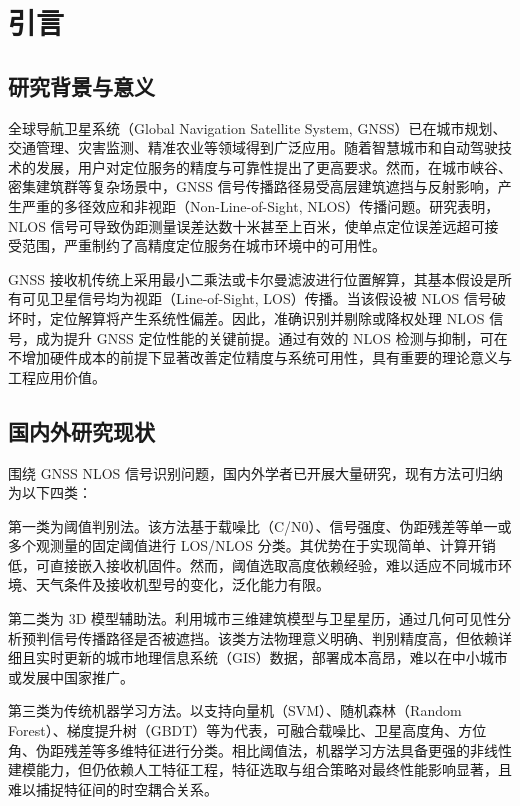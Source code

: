 \chapter{引言}

\section{研究背景与意义}

全球导航卫星系统（Global Navigation Satellite System, GNSS）已在城市规划、交通管理、灾害监测、精准农业等领域得到广泛应用。随着智慧城市和自动驾驶技术的发展，用户对定位服务的精度与可靠性提出了更高要求。然而，在城市峡谷、密集建筑群等复杂场景中，GNSS 信号传播路径易受高层建筑遮挡与反射影响，产生严重的多径效应和非视距（Non-Line-of-Sight, NLOS）传播问题。研究表明，NLOS 信号可导致伪距测量误差达数十米甚至上百米，使单点定位误差远超可接受范围，严重制约了高精度定位服务在城市环境中的可用性。

GNSS 接收机传统上采用最小二乘法或卡尔曼滤波进行位置解算，其基本假设是所有可见卫星信号均为视距（Line-of-Sight, LOS）传播。当该假设被 NLOS 信号破坏时，定位解算将产生系统性偏差。因此，准确识别并剔除或降权处理 NLOS 信号，成为提升 GNSS 定位性能的关键前提。通过有效的 NLOS 检测与抑制，可在不增加硬件成本的前提下显著改善定位精度与系统可用性，具有重要的理论意义与工程应用价值。

\section{国内外研究现状}

围绕 GNSS NLOS 信号识别问题，国内外学者已开展大量研究，现有方法可归纳为以下四类：

第一类为阈值判别法。该方法基于载噪比（C/N0）、信号强度、伪距残差等单一或多个观测量的固定阈值进行 LOS/NLOS 分类。其优势在于实现简单、计算开销低，可直接嵌入接收机固件。然而，阈值选取高度依赖经验，难以适应不同城市环境、天气条件及接收机型号的变化，泛化能力有限。

第二类为 3D 模型辅助法。利用城市三维建筑模型与卫星星历，通过几何可见性分析预判信号传播路径是否被遮挡。该类方法物理意义明确、判别精度高，但依赖详细且实时更新的城市地理信息系统（GIS）数据，部署成本高昂，难以在中小城市或发展中国家推广。

第三类为传统机器学习方法。以支持向量机（SVM）、随机森林（Random Forest）、梯度提升树（GBDT）等为代表，可融合载噪比、卫星高度角、方位角、伪距残差等多维特征进行分类。相比阈值法，机器学习方法具备更强的非线性建模能力，但仍依赖人工特征工程，特征选取与组合策略对最终性能影响显著，且难以捕捉特征间的时空耦合关系。

